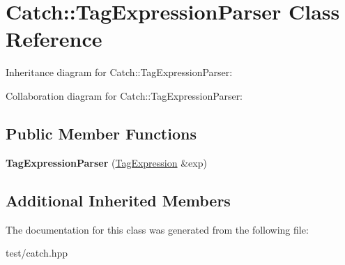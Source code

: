 \hypertarget{classCatch_1_1TagExpressionParser}{}\section{Catch\+:\+:Tag\+Expression\+Parser Class Reference}
\label{classCatch_1_1TagExpressionParser}


Inheritance diagram for Catch\+:\+:Tag\+Expression\+Parser\+:


Collaboration diagram for Catch\+:\+:Tag\+Expression\+Parser\+:
\subsection*{Public Member Functions}
\begin{DoxyCompactItemize}
\item 
{\bfseries Tag\+Expression\+Parser} (\hyperlink{classCatch_1_1TagExpression}{Tag\+Expression} \&exp)\hypertarget{classCatch_1_1TagExpressionParser_aeca33975125f6e824c2351312115a8a8}{}\label{classCatch_1_1TagExpressionParser_aeca33975125f6e824c2351312115a8a8}

\end{DoxyCompactItemize}
\subsection*{Additional Inherited Members}


The documentation for this class was generated from the following file\+:\begin{DoxyCompactItemize}
\item 
test/catch.\+hpp\end{DoxyCompactItemize}
